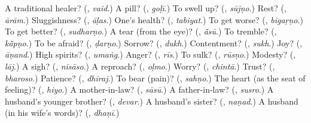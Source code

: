 \begin{tcolorbox}[breakable,colback=teal!4,colframe=teal!35!black,title={Before you move on}]
A traditional healer? (\textbf{}, \emph{vaid}.) A pill? (\textbf{}, \emph{goḷī}.) To swell up? (\textbf{}, \emph{sūjṇo}.) Rest? (\textbf{}, \emph{ārām}.) Sluggishness? (\textbf{}, \emph{āḷas}.) One's health? (\textbf{}, \emph{tabiyat}.) To get worse? (\textbf{}, \emph{bigaṛṇo}.) To get better? (\textbf{}, \emph{sudharṇo}.) A tear (from the eye)? (\textbf{}, \emph{ā̃sū}.) To tremble? (\textbf{}, \emph{kā̃pṇo}.) To be afraid? (\textbf{}, \emph{ḍarṇo}.) Sorrow? (\textbf{}, \emph{dukh}.) Contentment? (\textbf{}, \emph{sukh}.) Joy? (\textbf{}, \emph{āṇand}.) High spirits? (\textbf{}, \emph{umaṅg}.) Anger? (\textbf{}, \emph{rīs}.) To sulk? (\textbf{}, \emph{rūsṇo}.) Modesty? (\textbf{}, \emph{lāj}.) A sigh? (\textbf{}, \emph{nisāso}.) A reproach? (\textbf{}, \emph{oḷmo}.) Worry? (\textbf{}, \emph{chintā}.) Trust? (\textbf{}, \emph{bharoso}.) Patience? (\textbf{}, \emph{dhīraj}.) To bear (pain)? (\textbf{}, \emph{sahṇo}.) The heart (as the seat of feeling)? (\textbf{}, \emph{hiyo}.) A mother-in-law? (\textbf{}, \emph{sāsū}.) A father-in-law? (\textbf{}, \emph{susro}.) A husband's younger brother? (\textbf{}, \emph{devar}.) A husband's sister? (\textbf{}, \emph{naṇad}.) A husband (in his wife's words)? (\textbf{}, \emph{dhaṇī}.)
\end{tcolorbox}
